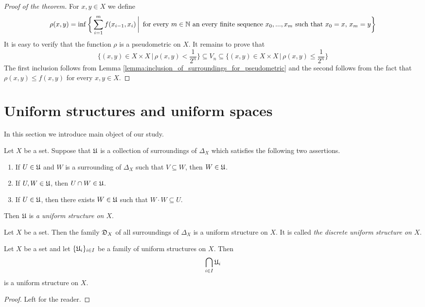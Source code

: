 \begin{proof}[Proof of the theorem]
For $x,y\in X$ we define
$$\rho(x,y) = \inf \bigg\{\sum_{i=1}^mf(x_{i-1},x_i)\,\bigg|\,\mbox{ for every }m\in {\mathbb N}\mbox{ an every finite sequence }x_0,...,x_m\mbox{ such that }x_0 = x,\,x_m = y\bigg\}$$
It is easy to verify that the function $\rho$ is a pseudometric on $X$. It remains to prove that
$$\bigg\{(x,y)\in X\times X\,\bigg|\,\rho(x,y)<\frac{1}{2^n}\bigg\} \subseteq V_n \subseteq \bigg\{(x,y)\in X\times X\,\bigg|\,\rho(x,y) \leq \frac{1}{2^n}\bigg\}$$
The first inclusion follows from Lemma \ref{lemma:inclusion_of_surroundings_for_pseudometric} and the second follows from the fact that $\rho(x,y) \leq f(x,y)$ for every $x,y\in X$.
\end{proof}

\section{Uniform structures and uniform spaces}
\noindent
In this section we introduce main object of our study.

\begin{definition}
Let $X$ be a set. Suppose that ${\mathfrak U}$ is a collection of surroundings of $\Delta_X$ which satisfies the following two assertions.
\begin{enumerate}[label=\textbf{(\arabic*)}, leftmargin=*]
\item If $U \in {\mathfrak U}$ and $W$ is a surrounding of $\Delta_X$ such that $V\subseteq W$, then $W\in {\mathfrak U}$.
\item If $U,W\in {\mathfrak U}$, then $U\cap W \in {\mathfrak U}$. 
\item If $U \in {\mathfrak U}$, then there exists $W\in {\mathfrak U}$ such that $W\cdot W \subseteq U$.
\end{enumerate}
Then ${\mathfrak U}$ is \textit{a uniform structure on $X$}.
\end{definition}

\begin{example}\label{example:discrete_uniform_structure}
Let $X$ be a set. Then the family ${\mathfrak D}_X$ of all surroundings of $\Delta_X$ is a uniform structure on $X$. It is called \textit{the discrete uniform structure on $X$}.
\end{example}

\begin{fact}\label{fact:uniform_structures_are_closed_under_intersections}
Let $X$ be a set and let $\{{\mathfrak U}_i\}_{i\in I}$ be a family of uniform structures on $X$. Then 
$$\bigcap_{i\in I}{\mathfrak U}_i$$
is a uniform structure on $X$.
\end{fact}
\begin{proof}
Left for the reader.
\end{proof}


